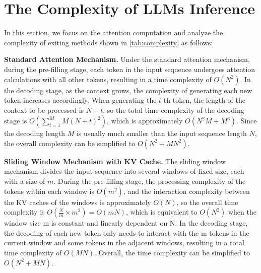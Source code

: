 \newpage

\section{The Complexity of LLMs Inference}

In this section, we focus on the attention computation and analyze the complexity of exiting methods shown in \cref{tab:complexity} as follows:


\textbf{Standard Attention Mechanism.}
Under the standard attention mechanism, during the pre-filling stage, each token in the input sequence undergoes attention calculations with all other tokens, resulting in a time complexity of $O(N^2)$. In the decoding stage, as the context grows, the complexity of generating each new token increases accordingly. When generating the $t$-th token, the length of the context to be processed is $N+t$, so the total time complexity of the decoding stage is $O(\sum^{M}_{t=1}M(N+t)^2)$, which is approximately $O(N^2M+M^3)$. Since the decoding length $M$ is usually much smaller than the input sequence length $N$, the overall complexity can be simplified to $O(N^2+MN^2)$.

\textbf{Sliding Window Mechanism with KV Cache.}
The sliding window mechanism divides the input sequence into several windows of fixed size, each with a size of $m$. During the pre-filling stage, the processing complexity of the tokens within each window is $O(m^2)$, and the interaction complexity between the KV caches of the windows is approximately $O(N)$, so the overall time complexity is $O(\frac{N}{m} \times m^2) = O(mN)$, which is equivalent to $O(N^2)$ when the window size m is constant and linearly dependent on N. In the decoding stage, the decoding of each new token only needs to interact with the m tokens in the current window and some tokens in the adjacent windows, resulting in a total time complexity of $O(MN)$. Overall, the time complexity can be simplified to $O(N^2+MN)$.


